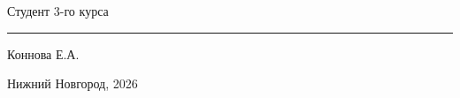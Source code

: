 \documentclass[a4paper,14pt]{extarticle}
\begin{document}
\begin{titlepage}
\begin{flushleft}
\begin{minipage}{0.85\textwidth}
            \vspace{1.5cm}
            
            Студент 3-го курса
            \hfill
            \rule{4cm}{0.4pt} Коннова Е.А.
        \end{minipage}
    \end{flushleft}

    \vfill

   
    \begin{center}
        {\small Нижний Новгород, 2026\par}
    \end{center}
\end{titlepage}

\tableofcontents
\newpage






\newpage
\printbibliography[title={Список литературы}]
\end{document}
